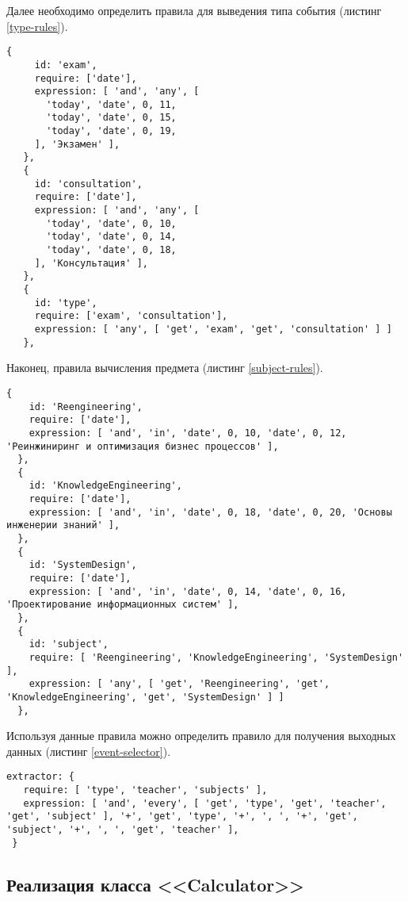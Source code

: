 Далее необходимо определить правила для выведения типа события (листинг \ref{type-rules}).

\begin{lstlisting}[caption={Правила для вычисления типа события},label={type-rules}]
  {
     id: 'exam',
     require: ['date'],
     expression: [ 'and', 'any', [
       'today', 'date', 0, 11,
       'today', 'date', 0, 15,
       'today', 'date', 0, 19,
     ], 'Экзамен' ],
   },
   {
     id: 'consultation',
     require: ['date'],
     expression: [ 'and', 'any', [
       'today', 'date', 0, 10,
       'today', 'date', 0, 14,
       'today', 'date', 0, 18,
     ], 'Консультация' ],
   },
   {
     id: 'type',
     require: ['exam', 'consultation'],
     expression: [ 'any', [ 'get', 'exam', 'get', 'consultation' ] ]
   },
\end{lstlisting}

Наконец, правила вычисления предмета (листинг \ref{subject-rules}).

\begin{lstlisting}[caption={Правила для вычисления предмета},label={subject-rules}]
  {
    id: 'Reengineering',
    require: ['date'],
    expression: [ 'and', 'in', 'date', 0, 10, 'date', 0, 12, 'Реинжиниринг и оптимизация бизнес процессов' ],
  },
  {
    id: 'KnowledgeEngineering',
    require: ['date'],
    expression: [ 'and', 'in', 'date', 0, 18, 'date', 0, 20, 'Основы инженерии знаний' ],
  },
  {
    id: 'SystemDesign',
    require: ['date'],
    expression: [ 'and', 'in', 'date', 0, 14, 'date', 0, 16, 'Проектирование информационных систем' ],
  },
  {
    id: 'subject',
    require: [ 'Reengineering', 'KnowledgeEngineering', 'SystemDesign' ],
    expression: [ 'any', [ 'get', 'Reengineering', 'get', 'KnowledgeEngineering', 'get', 'SystemDesign' ] ]
  },
\end{lstlisting}

Используя данные правила можно определить правило для получения выходных данных (листинг \ref{event-selector}).

\begin{lstlisting}[caption={Правило слияния параметров события},label={event-selector}]
  extractor: {
   require: [ 'type', 'teacher', 'subjects' ],
   expression: [ 'and', 'every', [ 'get', 'type', 'get', 'teacher', 'get', 'subject' ], '+', 'get', 'type', '+', ', ', '+', 'get', 'subject', '+', ', ', 'get', 'teacher' ],
 }
\end{lstlisting}

\subsection{Реализация класса <<Calculator>>}

